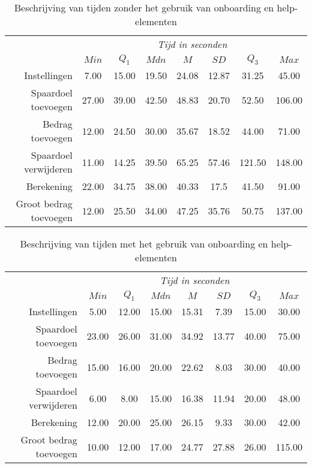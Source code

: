 \begin{table}[]
	\centering
	\begin{tabular}{r|ccccccc}
		\multicolumn{1}{l|}{} & \multicolumn{7}{c}{\textit{Tijd in seconden}} \\
		& $Min$ & $Q_1$ & $Mdn$ & $M$ & $SD$ & $Q_3$ & $Max$ \\ \hline
		Instellingen & 7.00 & 15.00 & 19.50 & 24.08 & 12.87 & 31.25 & 45.00 \\
		Spaardoel toevoegen & 27.00 & 39.00 & 42.50 & 48.83 & 20.70 & 52.50 & 106.00 \\
		Bedrag toevoegen & 12.00 & 24.50 & 30.00 & 35.67 & 18.52 & 44.00 & 71.00 \\
		Spaardoel verwijderen & 11.00 & 14.25 & 39.50 & 65.25 & 57.46 & 121.50 & 148.00 \\
		Berekening & 22.00 & 34.75 & 38.00 & 40.33 & 17.5 & 41.50 & 91.00 \\
		Groot bedrag toevoegen & 12.00 & 25.50 & 34.00 & 47.25 & 35.76 & 50.75 & 137.00
	\end{tabular}
	\caption{Beschrijving van tijden zonder het gebruik van onboarding en help-elementen}
	\label{tab:beschrijving-tijden-zonder-elementen}
\end{table}

\begin{table}[]
	\centering
	\begin{tabular}{r|ccccccc}
		\multicolumn{1}{l|}{} & \multicolumn{7}{c}{\textit{Tijd in seconden}} \\
		& $Min$ & $Q_1$ & $Mdn$ & $M$ & $SD$ & $Q_3$ & $Max$ \\ \hline
		Instellingen & 5.00 & 12.00 & 15.00 & 15.31 & 7.39 & 15.00 & 30.00 \\
		Spaardoel toevoegen & 23.00 & 26.00 & 31.00 & 34.92 & 13.77 & 40.00 & 75.00 \\
		Bedrag toevoegen & 15.00 & 16.00 & 20.00 & 22.62 & 8.03 & 30.00 & 40.00 \\
		Spaardoel verwijderen & 6.00 & 8.00 & 15.00 & 16.38 & 11.94 & 20.00 & 48.00 \\
		Berekening & 12.00 & 20.00 & 25.00 & 26.15 & 9.33 & 30.00 & 42.00 \\
		Groot bedrag toevoegen & 10.00 & 12.00 & 17.00 & 24.77 & 27.88 & 26.00 & 115.00
	\end{tabular}
	\caption{Beschrijving van tijden met het gebruik van onboarding en help-elementen}
	\label{tab:beschrijving-tijden-met-elementen}
\end{table}

